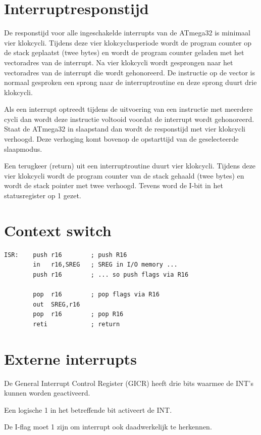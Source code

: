 \section{Interruptresponstijd}
De responstijd voor alle ingeschakelde interrupts van de ATmega32 is minimaal vier klokcycli.
Tijdens deze vier klokcyclusperiode wordt de program counter op de stack geplaatst (twee bytes)
en wordt de program counter geladen met het vectoradres van de interrupt.
Na vier klokcycli wordt gesprongen naar het vectoradres van de interrupt die wordt gehonoreerd.
De instructie op de vector is normaal gesproken een sprong naar de interruptroutine en deze
sprong duurt drie klokcycli.

Als een interrupt optreedt tijdens de uitvoering van een instructie met meerdere cycli dan
wordt deze instructie voltooid voordat de interrupt wordt gehonoreerd. Staat de ATmega32 in
slaapstand dan wordt de responstijd met vier klokcycli verhoogd. Deze verhoging komt bovenop
de opstarttijd van de geselecteerde slaapmodus.

Een terugkeer (return) uit een interruptroutine duurt vier klokcycli. Tijdens deze vier
klokcycli wordt de program counter van de stack gehaald (twee bytes) en wordt de stack
pointer met twee verhoogd. Tevens word de I-bit in het statusregister op 1 gezet.

\section{Context switch}

\begin{lstlisting}[language=AVRassembler,caption=Opslaan van de vlaggen.,label=cod:contextswich]
ISR:	push r16		; push R16
		in   r16,SREG	; SREG in I/O memory ...
		push r16		; ... so push flags via R16

		pop  r16		; pop flags via R16
		out  SREG,r16
		pop  r16		; pop R16
		reti			; return
\end{lstlisting}

\section{Externe interrupts}
De General Interrupt Control Register (GICR) heeft drie bits waarmee de INT’s kunnen worden geactiveerd.

Een logische 1 in het betreffende bit activeert de INT.

De I-flag moet 1 zijn om interrupt ook daadwerkelijk te herkennen.


